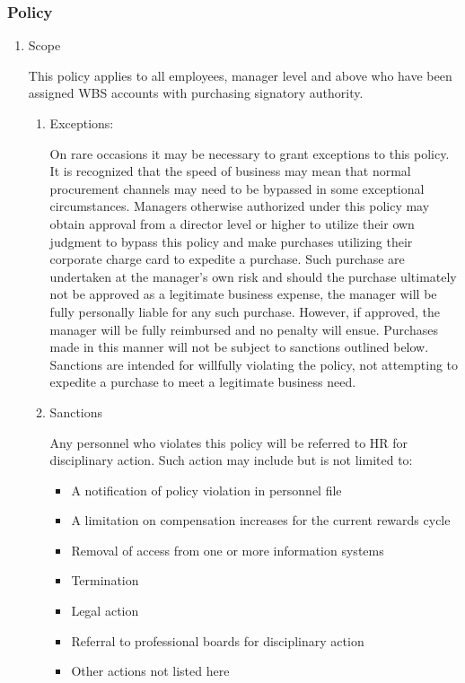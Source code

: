 \documentclass[stu]{apa7}
\begin{document}
\subsubsection{Policy}
\label{sec:org4836e1c}

\begin{enumerate}
\item Scope
\label{sec:org59c7322}

This policy applies to all employees, manager level and above who have been assigned WBS accounts with purchasing signatory authority.


\begin{enumerate}
\item Exceptions:
\label{sec:org0c8ba64}

On rare occasions it may be necessary to grant exceptions to this policy. It is recognized that the speed of business may mean that normal procurement channels may need to be bypassed in some exceptional circumstances. Managers otherwise authorized under this policy may obtain approval from a director level or higher to utilize their own judgment to bypass this policy and make purchases utilizing their corporate charge card to expedite a purchase. Such purchase are undertaken at the manager's own risk and should the purchase ultimately not be approved as a legitimate business expense, the manager will be fully personally liable for any such purchase. However, if approved, the manager will be fully reimbursed and no penalty will ensue. Purchases made in this manner will not be subject to sanctions outlined below. Sanctions are intended for willfully violating the policy, not attempting to expedite a purchase to meet a legitimate business need.

\item Sanctions
\label{sec:org2bc5a76}

Any personnel who violates this policy will be referred to HR for disciplinary action. Such action may include but is not limited to:

\begin{itemize}
\item A notification of policy violation in personnel file
\item A limitation on compensation increases for the current rewards cycle
\item Removal of access from one or more information systems
\item Termination
\item Legal action
\item Referral to professional boards for disciplinary action
\item Other actions not listed here
\end{itemize}
\end{enumerate}


\end{enumerate}
\end{document}

